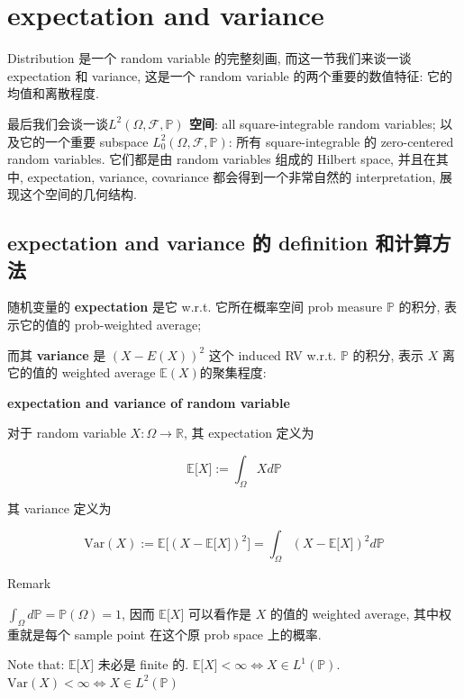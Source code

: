 \documentclass{qlnotes-export}
\begin{document}
\section{expectation and variance}\label{expectation-and-variance}

Distribution 是一个 random variable 的完整刻画, 而这一节我们来谈一谈 expectation 和 variance, 这是一个 random variable 的两个重要的数值特征: 它的均值和离散程度.

最后我们会谈一谈\textbf{\(L^{2}(\Omega,\mathcal{F},{\mathbb{P}})\) 空间}: all square-integrable random variables; 以及它的一个重要 subspace \(L_{0}^{2}(\Omega,\mathcal{F},{\mathbb{P}})\): 所有 square-integrable 的 zero-centered random variables. 它们都是由 random variables 组成的 Hilbert space, 并且在其中, expectation, variance, covariance 都会得到一个非常自然的 interpretation, 展现这个空间的几何结构.

\subsection{expectation and variance 的 definition 和计算方法}\label{expectation-and-variance-ux7684-definition-ux548cux8ba1ux7b97ux65b9ux6cd5}

随机变量的 \textbf{expectation} 是它 w.r.t. 它所在概率空间 prob measure \(\mathbb{P}\) 的积分, 表示它的值的 prob-weighted average;

而其 \textbf{variance} 是 \((X - E(X))^{2}\) 这个 induced RV w.r.t. \(\mathbb{P}\) 的积分, 表示 \(X\) 离它的值的 weighted average \({\mathbb{E}}(X)\)的聚集程度:

\begin{definition}{\protect{}\label{kn-expectation-and-variance-of-random-variable}{\textbf{expectation
and variance of random variable}}}

对于 random variable \(X:\Omega\rightarrow{\mathbb{R}}\), 其 expectation 定义为

\[{\mathbb{E}}\lbrack X\rbrack := \int_{\Omega}X d{\mathbb{P}}\]

其 variance 定义为

\[\text{Var}(X) := {\mathbb{E}}\lbrack(X - {\mathbb{E}}\lbrack X\rbrack)^{2}\rbrack = \int_{\Omega}(X - {\mathbb{E}}\lbrack X\rbrack)^{2} d{\mathbb{P}}\]

\end{definition}

\begin{qlremark}{Remark}

\(\int_{\Omega}d{\mathbb{P}} = {\mathbb{P}}(\Omega) = 1\), 因而 \({\mathbb{E}}\lbrack X\rbrack\) 可以看作是 \(X\) 的值的 weighted average, 其中权重就是每个 sample point 在这个原 prob space 上的概率.

Note that: \({\mathbb{E}}\lbrack X\rbrack\) 未必是 finite 的. \({\mathbb{E}}\lbrack X\rbrack < \infty\Leftrightarrow X \in L^{1}({\mathbb{P}})\). \(\text{Var}(X) < \infty\Leftrightarrow X \in L^{2}({\mathbb{P}})\)

\end{qlremark}
\end{document}

